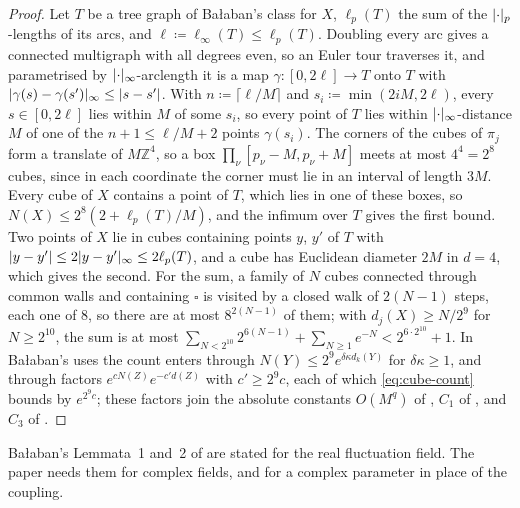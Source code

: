 \documentclass[11pt]{preprint}
\DeclarePairedDelimiter{\abs}{\lvert}{\rvert}
\numberwithin{equation}{section}
\theoremstyle{definition}
\theoremstyle{remark}
\theoremstyle{plain}
\begin{document}
\begin{proof}
Let $T$ be a tree graph of Ba{\l}aban's class for $X$, $\ell_p(T)$ the sum of the $\abs\cdot_p$-lengths of its arcs, and $\ell \coloneqq \ell_\infty(T) \leq \ell_p(T)$. Doubling every arc gives a connected multigraph with all degrees even, so an Euler tour traverses it, and parametrised by $\abs\cdot_\infty$-arclength it is a map $\gamma\colon [0, 2\ell] \to T$ onto $T$ with $\abs{\gamma(s) - \gamma(s')}_\infty \leq \abs{s - s'}$. With $n \coloneqq \lceil\ell/M\rceil$ and $s_i \coloneqq \min(2iM, 2\ell)$, every $s \in [0, 2\ell]$ lies within $M$ of some $s_i$, so every point of $T$ lies within $\abs\cdot_\infty$-distance $M$ of one of the $n + 1 \leq \ell/M + 2$ points $\gamma(s_i)$. The corners of the cubes of $\pi_j$ form a translate of $M\mathbb Z^4$, so a box $\prod_\nu[p_\nu - M, p_\nu + M]$ meets at most $4^4 = 2^8$ cubes, since in each coordinate the corner must lie in an interval of length $3M$. Every cube of $X$ contains a point of $T$, which lies in one of these boxes, so $N(X) \leq 2^8(2 + \ell_p(T)/M)$, and the infimum over $T$ gives the first bound. Two points of $X$ lie in cubes containing points $y$, $y'$ of $T$ with $\abs{y - y'} \leq 2\abs{y - y'}_\infty \leq 2\ell_p(T)$, and a cube has Euclidean diameter $2M$ in $d = 4$, which gives the second. For the sum, a family of $N$ cubes connected through common walls and containing $\square$ is visited by a closed walk of $2(N - 1)$ steps, each one of $8$, so there are at most $8^{2(N-1)}$ of them; with $d_j(X) \geq N/2^9$ for $N \geq 2^{10}$, the sum is at most $\sum_{N<2^{10}}2^{6(N-1)} + \sum_{N\geq1}e^{-N} < 2^{6\cdot2^{10}} + 1$. In Ba{\l}aban's uses the count enters through $N(Y) \leq 2^9e^{\delta\kappa d_k(Y)}$ for $\delta\kappa \geq 1$, and through factors $e^{cN(Z)}e^{-c'd(Z)}$ with $c' \geq 2^9c$, each of which \eqref{eq:cube-count} bounds by $e^{2^9c}$; these factors join the absolute constants $O(M^q)$ of \cite[(1.29)]{BalabanRG2}, $C_1$ of \cite[(1.36)]{BalabanRG2}, and $C_3$ of \cite[p.~20]{BalabanRG2}.
\end{proof}

Ba{\l}aban's Lemmata~1 and~2 of \cite[pp.~9--11]{BalabanRG2} are stated for the real fluctuation field. The paper needs them for complex fields, and for a complex parameter in place of the coupling.
\end{document}
